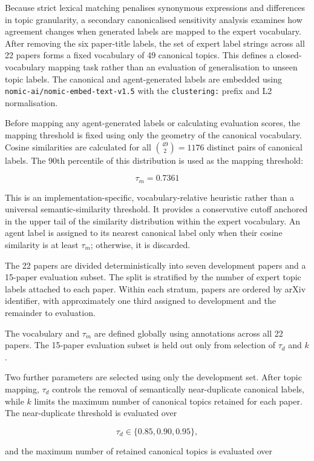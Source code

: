 \documentclass[runningheads]{llncs}
\begin{document}
Because strict lexical matching penalises synonymous expressions and
differences in topic granularity, a secondary canonicalised sensitivity
analysis examines how agreement changes when generated labels are mapped
to the expert vocabulary. After removing the six paper-title labels, the
set of expert label strings across all 22 papers forms a fixed vocabulary
of 49 canonical topics. This defines a closed-vocabulary mapping task
rather than an evaluation of generalisation to unseen topic labels. The
canonical and agent-generated labels are embedded using
\texttt{nomic-ai/nomic-embed-text-v1.5} with the
\texttt{clustering:} prefix and L2 normalisation.

Before mapping any agent-generated labels or calculating evaluation
scores, the mapping threshold is fixed using only the geometry of the
canonical vocabulary. Cosine similarities are calculated for all
\(\binom{49}{2}=1176\) distinct pairs of canonical labels. The
90th percentile of this distribution is used as the mapping threshold:

\[
\tau_m =0.7361
\]

This is an implementation-specific, vocabulary-relative heuristic
rather than a universal semantic-similarity threshold. It provides a
conservative cutoff anchored in the upper tail of the similarity
distribution within the expert vocabulary. An agent label is assigned
to its nearest canonical label only when their cosine similarity is at
least \(\tau_m\); otherwise, it is discarded.

The 22 papers are divided deterministically into seven development
papers and a 15-paper evaluation subset. The split is stratified by the
number of expert topic labels attached to each paper. Within each
stratum, papers are ordered by arXiv identifier, with approximately one
third assigned to development and the remainder to evaluation.

The vocabulary and \(\tau_m\) are defined globally using annotations
across all 22 papers. The 15-paper evaluation subset is held out only
from selection of \(\tau_d\) and \(k\).

Two further parameters are selected using only the development set.
After topic mapping, \(\tau_d\) controls the removal of semantically
near-duplicate canonical labels, while \(k\) limits the maximum number
of canonical topics retained for each paper. The near-duplicate
threshold is evaluated over

\[
\tau_d \in \{0.85,0.90,0.95\},
\]

and the maximum number of retained canonical topics is evaluated over
\end{document}
